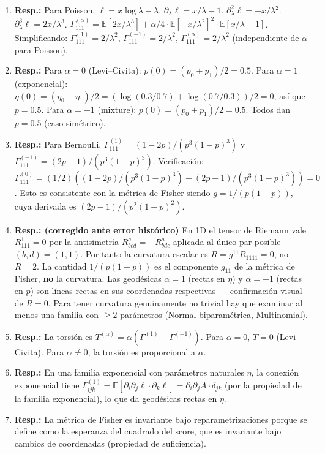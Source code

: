 \begin{enumerate}
	\item \textbf{Resp.:} Para Poisson, $\ell = x\log\lambda - \lambda$.  $\partial_\lambda \ell = x/\lambda - 1$.  $\partial_\lambda^2 \ell = -x/\lambda^2$.  $\partial_\lambda^3 \ell = 2x/\lambda^3$.  $\Gamma^{(\alpha)}_{111} = \mathbb{E}[2x/\lambda^3] + \alpha/4 \cdot \mathbb{E}[-x/\lambda^2]^2 \cdot \mathbb{E}[x/\lambda - 1]$.  Simplificando: $\Gamma^{(1)}_{111} = 2/\lambda^2$, $\Gamma^{(-1)}_{111} = 2/\lambda^2$, $\Gamma^{(\alpha)}_{111} = 2/\lambda^2$ (independiente de $\alpha$ para Poisson).
	\item \textbf{Resp.:} Para $\alpha=0$ (Levi--Civita): $p(0) = (p_0 + p_1)/2 = 0.5$.  Para $\alpha=1$ (exponencial): $\eta(0) = (\eta_0 + \eta_1)/2 = (\log(0.3/0.7) + \log(0.7/0.3))/2 = 0$, así que $p = 0.5$.  Para $\alpha=-1$ (mixture): $p(0) = (p_0 + p_1)/2 = 0.5$.  Todos dan $p = 0.5$ (caso simétrico).
	\item \textbf{Resp.:} Para Bernoulli, $\Gamma^{(1)}_{111} = (1-2p)/(p^3(1-p)^3)$ y $\Gamma^{(-1)}_{111} = (2p-1)/(p^3(1-p)^3)$.  Verificación: $\Gamma^{(0)}_{111} = (1/2)((1-2p)/(p^3(1-p)^3) + (2p-1)/(p^3(1-p)^3)) = 0$.  Esto es consistente con la métrica de Fisher siendo $g = 1/(p(1-p))$, cuya derivada es $(2p-1)/(p^2(1-p)^2)$.
	\item \textbf{Resp.: (corregido ante error histórico)} En 1D el tensor de Riemann vale $R^1_{111} = 0$ por la antisimetría $R^a_{bcd} = -R^a_{bdc}$ aplicada al único par posible $(b,d) = (1,1)$. Por tanto la curvatura escalar es $R = g^{11} R_{1 1 1 1} = 0$, no $R = 2$. La cantidad $1/(p(1-p))$ es el componente $g_{11}$ de la métrica de Fisher, \textbf{no} la curvatura. Las geodésicas $\alpha=1$ (rectas en $\eta$) y $\alpha=-1$ (rectas en $p$) son líneas rectas en sus coordenadas respectivas — confirmación visual de $R=0$. Para tener curvatura genuinamente no trivial hay que examinar al menos una familia con $\ge 2$ parámetros (Normal biparamétrica, Multinomial).
	\item \textbf{Resp.:} La torsión es $T^{(\alpha)} = \alpha(\Gamma^{(1)} - \Gamma^{(-1)})$.  Para $\alpha=0$, $T=0$ (Levi--Civita).  Para $\alpha \ne 0$, la torsión es proporcional a $\alpha$.
	\item \textbf{Resp.:} En una familia exponencial con parámetros naturales $\eta$, la conexión exponencial tiene $\Gamma^{(1)}_{ijk} = \mathbb{E}[\partial_i \partial_j \ell \cdot \partial_k \ell] = \partial_i \partial_j A \cdot \delta_{jk}$ (por la propiedad de la familia exponencial), lo que da geodésicas rectas en $\eta$.
	\item \textbf{Resp.:} La métrica de Fisher es invariante bajo reparametrizaciones porque se define como la esperanza del cuadrado del score, que es invariante bajo cambios de coordenadas (propiedad de suficiencia).

\end{enumerate}
